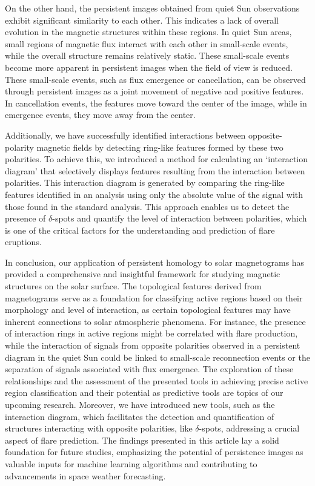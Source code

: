 \documentclass[12pt]{mythesis}
\begin{document}
On the other hand, the persistent images obtained from quiet Sun observations exhibit significant similarity to each other. This indicates a lack of overall evolution in the magnetic structures within these regions. In quiet Sun areas, small regions of magnetic flux interact with each other in small-scale events, while the overall structure remains relatively static. These small-scale events become more apparent in persistent images when the field of view is reduced. These small-scale events, such as flux emergence or cancellation, can be observed through persistent images as a joint movement of negative and positive features. In cancellation events, the features move toward the center of the image, while in emergence events, they move away from the center.

Additionally, we have successfully identified interactions between opposite-polarity magnetic fields by detecting ring-like features formed by these two polarities. To achieve this, we introduced a method for calculating an `interaction diagram' that selectively displays features resulting from the interaction between polarities. This interaction diagram is generated by comparing the ring-like features identified in an analysis using only the absolute value of the signal with those found in the standard analysis. This approach enables us to detect the presence of $\delta$-spots and quantify the level of interaction between polarities, which is one of the critical factors for the understanding and prediction of flare eruptions. 

In conclusion, our application of persistent homology to solar magnetograms has provided a comprehensive and insightful framework for studying magnetic structures on the solar surface. The topological features derived from magnetograms serve as a foundation for classifying active regions based on their morphology and level of interaction, as certain topological features may have inherent connections to solar atmospheric phenomena. For instance, the presence of interaction rings in active regions might be correlated with flare production, while the interaction of signals from opposite polarities observed in a persistent diagram in the quiet Sun could be linked to small-scale reconnection events or the separation of signals associated with flux emergence. The exploration of these relationships and the assessment of the presented tools in achieving precise active region classification and their potential as predictive tools are topics of our upcoming research. Moreover, we have introduced new tools, such as the interaction diagram, which facilitates the detection and quantification of structures interacting with opposite polarities, like $\delta$-spots, addressing a crucial aspect of flare prediction. The findings presented in this article lay a solid foundation for future studies, emphasizing the potential of persistence images as valuable inputs for machine learning algorithms and contributing to advancements in space weather forecasting.
\end{document}
